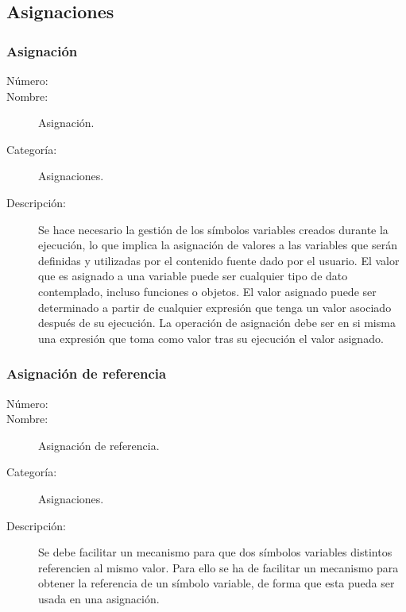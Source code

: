 \subsection{Asignaciones}
\subsubsection{Asignación}
\begin{framed}
	\begin{description}
		\item [Número:] \cn
		\item [Nombre:] Asignación.
		\item [Categoría:] Asignaciones.
		\item [Descripción:] Se hace necesario la gestión de los símbolos variables creados durante la ejecución, lo que implica
		la asignación de valores a las variables que serán definidas y utilizadas por el contenido fuente dado por el usuario.
		El valor que es asignado a una variable puede ser cualquier tipo de dato contemplado, incluso funciones o objetos. El valor asignado
		puede ser determinado a partir de cualquier expresión que tenga un valor asociado después de su ejecución.  La operación de asignación debe ser en si misma una expresión que toma como
		valor tras su ejecución el valor asignado.
	\end {description}
\end{framed}

\subsubsection{Asignación de referencia}
\begin{framed}
	\begin{description}
		\item [Número:] \cn
		\item [Nombre:] Asignación de referencia.
		\item [Categoría:] Asignaciones.
		\item [Descripción:] Se debe facilitar un mecanismo para que dos símbolos variables distintos referencien al mismo valor.
		Para ello se ha de facilitar un mecanismo para obtener la referencia de un símbolo variable, de forma que esta pueda ser usada en una asignación.
	\end {description}
\end{framed}
